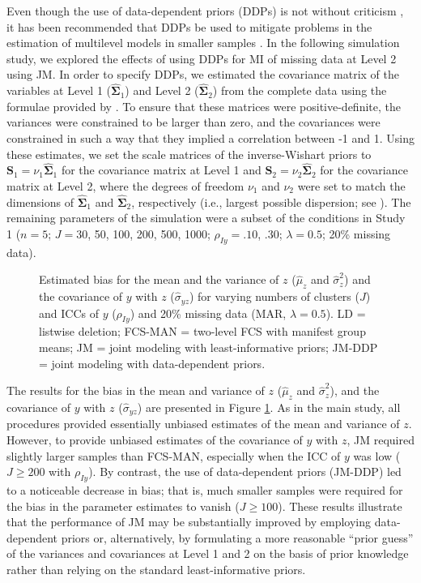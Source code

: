 \documentclass[doc,12pt]{apa6}
\begin{document}
\noindent
Even though the use of data-dependent priors (DDPs) is not without criticism \citep[e.g., see][]{Gelman2014}, it has been recommended that DDPs be used to mitigate problems in the estimation of multilevel models in smaller samples \citep[e.g.,][]{McNeish2016,Grund2016}.
In the following simulation study, we explored the effects of using DDPs for MI of missing data at Level 2 using JM.
In order to specify DDPs, we estimated the covariance matrix of the variables at Level 1 ($\hat{\boldsymbol\Sigma}_1$) and Level 2 ($\hat{\boldsymbol\Sigma}_2$) from the complete data using the formulae provided by \citet{Muthen1994}.
To ensure that these matrices were positive-definite, the variances were constrained to be larger than zero, and the covariances were constrained in such a way that they implied a correlation between -1 and 1.
Using these estimates, we set the scale matrices of the inverse-Wishart priors to $\mathbf{S}_1=\nu_1 \hat{\boldsymbol\Sigma}_1$ for the covariance matrix at Level 1 and $\mathbf{S}_2=\nu_2 \hat{\boldsymbol\Sigma}_2$ for the covariance matrix at Level 2, where the degrees of freedom $\nu_1$ and $\nu_2$ were set to match the dimensions of $\hat{\boldsymbol\Sigma}_1$ and $\hat{\boldsymbol\Sigma}_2$, respectively (i.e., largest possible dispersion; see \citealp{Schafer2002a}).
The remaining parameters of the simulation were a subset of the conditions in Study 1 ($n=5$; $J=30$, 50, 100, 200, 500, 1000; $\rho_{Iy}=.10$, .30; $\lambda=0.5$; 20\% missing data).

\begin{figure}[t]
  \centering
  \caption{\small Estimated bias for the mean and the variance of $z$ ($\hat\mu_{z}$ and $\hat\sigma_{z}^{2}$) and the covariance of $y$ with $z$ ($\hat\sigma_{yz}$) for varying numbers of clusters ($J$) and ICCs of $y$ ($\rho_{Iy}$) and 20\% missing data (MAR, $\lambda=0.5$). LD = listwise deletion; FCS-MAN = two-level FCS with manifest group means; JM = joint modeling with least-informative priors; JM-DDP = joint modeling with data-dependent priors.}
  \label{fig:sup-ddp}
\end{figure}

The results for the bias in the mean and variance of $z$ ($\hat\mu_z$ and $\hat\sigma_z^2$), and the covariance of $y$ with $z$ ($\hat\sigma_{yz}$) are presented in Figure \ref{fig:sup-ddp}.
As in the main study, all procedures provided essentially unbiased estimates of the mean and variance of $z$.
However, to provide unbiased estimates of the covariance of $y$ with $z$, JM required slightly larger samples than FCS-MAN, especially when the ICC of $y$ was low ($J\geq200$ with $\rho_{Iy}$).
By contrast, the use of data-dependent priors (JM-DDP) led to a noticeable decrease in bias; that is, much smaller samples were required for the bias in the parameter estimates to vanish ($J\geq100$).
These results illustrate that the performance of JM may be substantially improved by employing data-dependent priors or, alternatively, by formulating a more reasonable ``prior guess'' of the variances and covariances at Level 1 and 2 on the basis of prior knowledge rather than relying on the standard least-informative priors.
\end{document}
